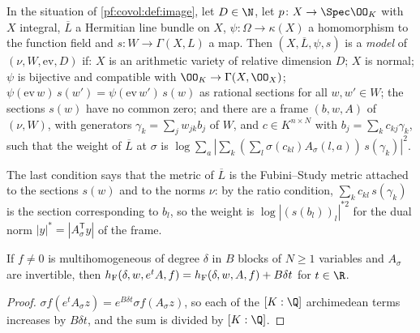 \begin{definition}\label{pf:covol:def:model}
In the situation of \cref{pf:covol:def:image}, let $D\in\N$, let $p\colon X\to\Spec\OO_K$ with $X$
integral, $\overline L$ a Hermitian line bundle on $X$, $\psi\colon\Omega\to\kappa(X)$ a homomorphism to
the function field and $s\colon W\to\Gamma(X,L)$ a map. Then $(X,\overline L,\psi,s)$ is a \emph{model}
of $(\nu,W,\mathrm{ev},D)$ if: $X$ is an arithmetic variety of relative dimension $D$; $X$ is normal;
$\psi$ is bijective and compatible with $\OO_K\to\Gamma(X,\OO_X)$; $\psi(\mathrm{ev}\,w)\,s(w')=
\psi(\mathrm{ev}\,w')\,s(w)$ as rational sections for all $w,w'\in W$; the sections $s(w)$ have no
common zero; and there are a frame $(b,w,A)$ of $(\nu,W)$, with generators $\gamma_k=\sum_jw_{jk}b_j$ of
$W$, and $c\in K^{n\times N}$ with $b_j=\sum_kc_{kj}\gamma_k$, such that the weight of $\overline L$ at
$\sigma$ is $\log\sum_a|\sum_k(\sum_l\sigma(c_{kl})A_\sigma(l,a))\,s(\gamma_k)|^2$.
\end{definition}

The last condition says that the metric of $\overline L$ is the Fubini--Study metric attached to the
sections $s(w)$ and to the norms $\nu$: by the ratio condition, $\sum_kc_{kl}\,s(\gamma_k)$ is the
section corresponding to $b_l$, so the weight is $\log|(s(b_l))_l|^{*2}$ for the dual norm
$|y|^*=|A_\sigma^{\mathsf T}y|$ of the frame.

\begin{lemma}[Scaling]\label{pf:covol:lem:scaling}
If $f\ne0$ is multihomogeneous of degree $\delta$ in $B$ blocks of $N\ge1$ variables and $A_\sigma$ are
invertible, then $h_{\mathrm{F}}(\delta,w,e^tA,f)=h_{\mathrm{F}}(\delta,w,A,f)+B\delta t$ for $t\in\R$.
\end{lemma}

\begin{proof}
$\sigma f(e^tA_\sigma z)=e^{B\delta t}\sigma f(A_\sigma z)$, so each of the $[K:\Q]$ archimedean terms
increases by $B\delta t$, and the sum is divided by $[K:\Q]$.
\end{proof}

